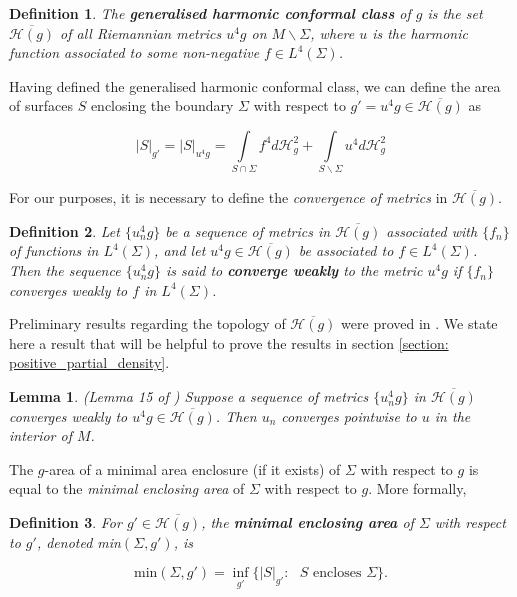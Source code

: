 \documentclass{amsart}
\newcommand{\hm}{\mathscr{H}}
\newcommand{\s}{\Sigma}
\newcommand{\gh}{\overline{\mathcal{H}(g)}}
\newtheorem{lemma}{Lemma}
\newtheorem{definition}{Definition}
\theoremstyle{named}
\begin{document}
\begin{definition}
    The \textbf{generalised harmonic conformal class} of $g$ is the set $\overline{\mathcal{H}(g)}$ of all Riemannian metrics $u^4g$ on $M \backslash \s$, where $u$ is the harmonic function associated to some non-negative $f \in L^4(\s)$.
\end{definition}

Having defined the generalised harmonic conformal class, we can define the area of surfaces $S$ enclosing the boundary $\s$ with respect to $g' = u^4g \in \overline{\mathcal{H}(g)}$ as 

\begin{equation*}
    |S|_{g'} = |S|_{u^4g} = \int\limits_{S \cap \s} f^4 d\hm^2_g + \int\limits_{S \backslash \s} u^4 d\hm^2_g
\end{equation*}

For our purposes, it is necessary to define the \textit{convergence of metrics} in $\gh$.

\begin{definition}
    Let $\{ u_n^4g \}$ be a sequence of metrics in $\gh$ associated with $\{ f_n \}$ of functions in $L^4(\s)$, and let $u^4g \in \gh$ be associated to $f \in L^4(\s)$. Then the sequence $\{ u_n^4g \}$ is said to \textbf{converge weakly} to the metric $u^4g$ if $\{ f_n \}$ converges weakly to $f$ in $L^4(\Sigma)$.
\end{definition}

Preliminary results regarding the topology of $\gh$ were proved in \cite{jeff}. We state here a result that will be helpful to prove the results in section \ref{section: positive_partial_density}.

\begin{lemma} (Lemma 15 of \cite{jeff}) 
    Suppose a sequence of metrics $\{ u_n^4g \}$ in $\gh$ converges weakly to $u^4g \in \gh$. Then $u_n$ converges pointwise to $u$ in the interior of $M$.
\end{lemma}

The $g$-area of a minimal area enclosure (if it exists) of $\Sigma$ with respect to $g$ is equal to the \textit{minimal enclosing area} of $\s$ with respect to $g$. More formally,

\begin{definition}
    For $g' \in \gh$, the \textbf{minimal enclosing area} of $\s$ with respect to $g'$, denoted min$(\s,g')$, is

    \begin{equation*}
        \text{min}(\s, g') = \inf\limits_{g'}\{ |S|_{g'} : \text{ $S$ encloses $\s$} \}.
    \end{equation*}
    
\end{definition}
\end{document}
